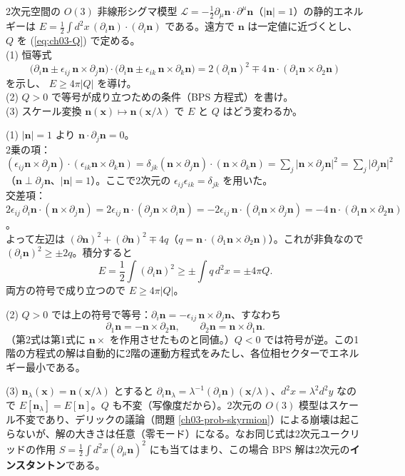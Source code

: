 \begin{problem}[難易度 B]\label{ch03-prob-bogo}
2次元空間の $O(3)$ 非線形シグマ模型 $\mathcal L=-\frac12\partial_\mu\bm n\cdot\partial^\mu\bm n$（$\lvert\bm n\rvert=1$）の静的エネルギーは $E=\frac12\int d^2x\,(\partial_i\bm n)\cdot(\partial_i\bm n)$ である。遠方で $\bm n$ は一定値に近づくとし、$Q$ を (\ref{eq:ch03-Q}) で定める。\\
(1) 恒等式
\[
\bigl(\partial_i\bm n\pm\epsilon_{ij}\,\bm n\times\partial_j\bm n\bigr)\cdot\bigl(\partial_i\bm n\pm\epsilon_{ik}\,\bm n\times\partial_k\bm n\bigr)=2(\partial_i\bm n)^2\mp4\,\bm n\cdot(\partial_1\bm n\times\partial_2\bm n)
\]
を示し、 $E\ge4\pi\lvert Q\rvert$ を導け。\\
(2) $Q>0$ で等号が成り立つための条件（BPS 方程式）を書け。\\
(3) スケール変換 $\bm n(\bm x)\mapsto\bm n(\bm x/\lambda)$ で $E$ と $Q$ はどう変わるか。
\end{problem}

\begin{solution}
(1) $\lvert\bm n\rvert=1$ より $\bm n\cdot\partial_j\bm n=0$。\\
2乗の項：$(\epsilon_{ij}\bm n\times\partial_j\bm n)\cdot(\epsilon_{ik}\bm n\times\partial_k\bm n)=\delta_{jk}(\bm n\times\partial_j\bm n)\cdot(\bm n\times\partial_k\bm n)=\sum_j\lvert\bm n\times\partial_j\bm n\rvert^2=\sum_j\lvert\partial_j\bm n\rvert^2$（$\bm n\perp\partial_j\bm n$、$\lvert\bm n\rvert=1$）。ここで2次元の $\epsilon_{ij}\epsilon_{ik}=\delta_{jk}$ を用いた。\\
交差項：$2\epsilon_{ij}\,\partial_i\bm n\cdot(\bm n\times\partial_j\bm n)=2\epsilon_{ij}\,\bm n\cdot(\partial_j\bm n\times\partial_i\bm n)=-2\epsilon_{ij}\,\bm n\cdot(\partial_i\bm n\times\partial_j\bm n)=-4\,\bm n\cdot(\partial_1\bm n\times\partial_2\bm n)$。\\
よって左辺は $(\partial\bm n)^2+(\partial\bm n)^2\mp4q$（$q=\bm n\cdot(\partial_1\bm n\times\partial_2\bm n)$）。これが非負なので $(\partial_i\bm n)^2\ge\pm2q$。積分すると
\[
E=\frac12\int(\partial_i\bm n)^2\ge\pm\int q\,d^2x=\pm4\pi Q .
\]
両方の符号で成り立つので $E\ge4\pi\lvert Q\rvert$。

(2) $Q>0$ では上の符号で等号：$\partial_i\bm n=-\epsilon_{ij}\,\bm n\times\partial_j\bm n$、すなわち
\[
\partial_1\bm n=-\bm n\times\partial_2\bm n,\qquad\partial_2\bm n=\bm n\times\partial_1\bm n .
\]
（第2式は第1式に $\bm n\times$ を作用させたものと同値。）$Q<0$ では符号が逆。この1階の方程式の解は自動的に2階の運動方程式をみたし、各位相セクターでエネルギー最小である。

(3) $\bm n_\lambda(\bm x)=\bm n(\bm x/\lambda)$ とすると $\partial_i\bm n_\lambda=\lambda^{-1}(\partial_i\bm n)(\bm x/\lambda)$、$d^2x=\lambda^2d^2y$ なので $E[\bm n_\lambda]=E[\bm n]$。$Q$ も不変（写像度だから）。2次元の $O(3)$ 模型はスケール不変であり、デリックの議論（問題 \ref{ch03-prob-skyrmion}）による崩壊は起こらないが、解の大きさは任意（零モード）になる。なお同じ式は2次元ユークリッドの作用 $S=\frac12\int d^2x(\partial_\mu\bm n)^2$ にも当てはまり、この場合 BPS 解は2次元の\textbf{インスタントン}である。
\end{solution}

